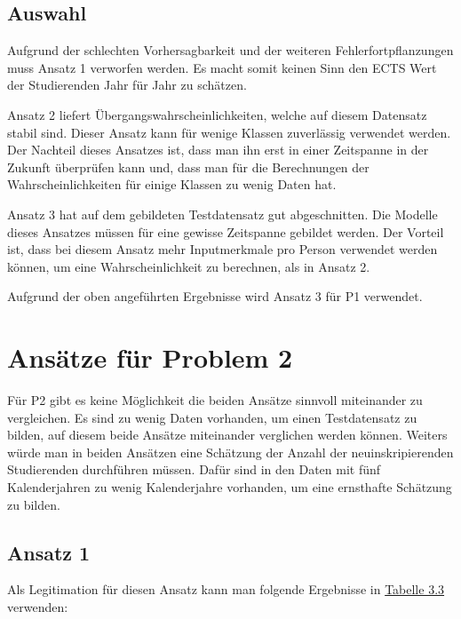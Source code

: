 \subsection{Auswahl}
Aufgrund der schlechten Vorhersagbarkeit und der weiteren Fehlerfortpflanzungen muss Ansatz 1 verworfen werden. Es macht somit keinen Sinn den ECTS Wert
der Studierenden Jahr f\"ur Jahr zu sch\"atzen.

Ansatz 2 liefert \"Ubergangswahrscheinlichkeiten, welche auf diesem Datensatz stabil sind. Dieser Ansatz kann f\"ur wenige Klassen zuverl\"assig verwendet werden.
Der Nachteil dieses Ansatzes ist, dass man ihn erst in einer Zeitspanne in der Zukunft \"uberpr\"ufen kann und, dass man f\"ur die Berechnungen der Wahrscheinlichkeiten
f\"ur einige Klassen zu wenig Daten hat.

Ansatz 3 hat auf dem gebildeten Testdatensatz gut abgeschnitten. Die Modelle dieses Ansatzes m\"ussen f\"ur eine gewisse Zeitspanne gebildet werden. Der Vorteil ist, dass
bei diesem Ansatz mehr Inputmerkmale pro Person verwendet werden k\"onnen, um eine Wahrscheinlichkeit zu berechnen, als in Ansatz 2.

Aufgrund der oben angef\"uhrten Ergebnisse wird Ansatz 3 f\"ur P1 verwendet.








\section{Ans\"atze f\"ur Problem 2}
F\"ur P2 gibt es keine M\"oglichkeit die beiden Ans\"atze sinnvoll miteinander zu vergleichen. Es sind zu wenig Daten vorhanden,
um einen Testdatensatz zu bilden, auf diesem beide Ans\"atze miteinander verglichen werden k\"onnen. Weiters w\"urde man in beiden
Ans\"atzen eine Sch\"atzung der Anzahl der neuinskripierenden Studierenden durchf\"uhren m\"ussen. Daf\"ur sind in den Daten mit f\"unf Kalenderjahren
zu wenig Kalenderjahre vorhanden, um eine ernsthafte Sch\"atzung zu bilden.


\subsection{Ansatz 1}
Als Legitimation f\"ur diesen Ansatz kann man folgende Ergebnisse in \hyperref[tab:legitimationA1P2]{Tabelle 3.3} verwenden:

